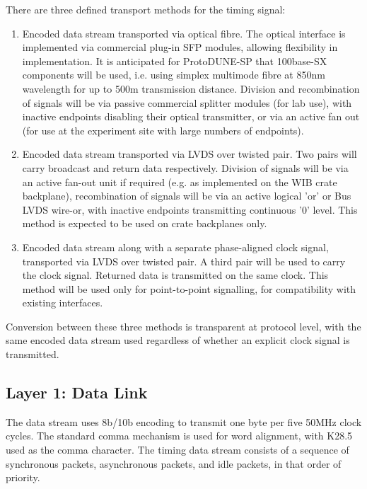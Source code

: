 \documentclass[a4paper,11pt]{article}
\begin{document}
There are three defined transport methods for the timing signal:

\begin{enumerate}
	\item Encoded data stream transported via optical fibre. The optical interface is implemented via commercial plug-in SFP modules, allowing flexibility in implementation. It is anticipated for ProtoDUNE-SP that 100base-SX components will be used, i.e. using simplex multimode fibre at 850nm wavelength for up to 500m transmission distance. Division and recombination of signals will be via passive commercial splitter modules (for lab use), with inactive endpoints disabling their optical transmitter, or via an active fan out (for use at the experiment site with large numbers of endpoints).
	\item Encoded data stream transported via LVDS over twisted pair. Two pairs will carry broadcast and return data respectively. Division of signals will be via an active fan-out unit if required (e.g. as implemented on the WIB crate backplane), recombination of signals will be via an active logical 'or' or Bus LVDS wire-or, with inactive endpoints transmitting continuous '0' level. This method is expected to be used on crate backplanes only.
	\item Encoded data stream along with a separate phase-aligned clock signal, transported via LVDS over twisted pair. A third pair will be used to carry the clock signal. Returned data is transmitted on the same clock. This method will be used only for point-to-point signalling, for compatibility with existing interfaces.
\end{enumerate}

Conversion between these three methods is transparent at protocol level, with the same encoded data stream used regardless of whether an explicit clock signal is transmitted.

\subsection{Layer 1: Data Link}

The data stream uses 8b/10b encoding to transmit one byte per five 50MHz clock cycles. The standard comma mechanism is used for word alignment, with K28.5 used as the comma character. The timing data stream consists of a sequence of synchronous packets, asynchronous packets, and idle packets, in that order of priority.
\end{document}

